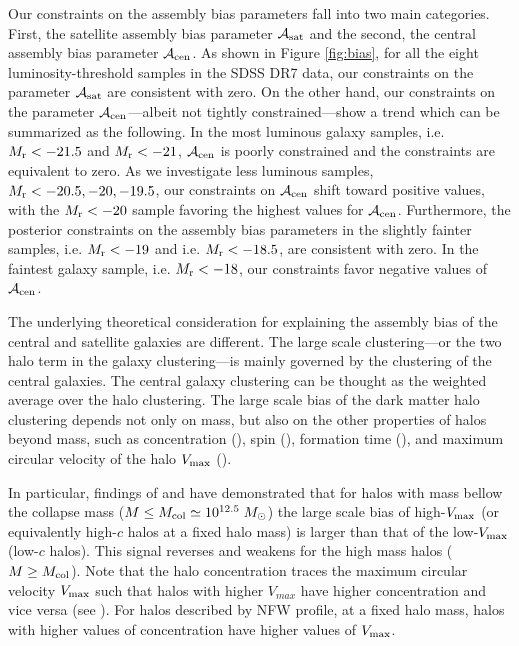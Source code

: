 \documentclass[12pt, preprint]{aastex}
\newcommand{\acen}{\mathcal{A}_{\rm cen}}
\newcommand{\asat}{\mathcal{A}_{\rm sat}}
\begin{document}
Our constraints on the assembly bias parameters fall into two main categories. First, the satellite 
assembly bias parameter $\asat$ and the second, the central assembly bias parameter $\acen$. As shown in Figure \ref{fig:bias}, for all the eight luminosity-threshold samples in the SDSS DR7 data, our constraints on the parameter $\asat$ are 
consistent with zero. On the other hand, our constraints on the parameter $\acen$---albeit not tightly constrained---show a trend which can be summarized as the following. In the most luminous galaxy samples, i.e. $M_{\rm r} < -21.5$ and $M_{\rm r} < -21$, $\acen$ is poorly constrained and the constraints are equivalent to zero. As we investigate less luminous samples, $M_{\rm r} < -20.5 , -20, -19.5$, our constraints on $\acen$ shift toward positive values, with the $M_{\rm r}<-20$ sample favoring the highest values for $\acen$. Furthermore, the posterior constraints on the assembly bias parameters in the slightly fainter samples, i.e. $M_{\rm r} < -19$ and i.e. $M_{\rm r} < -18.5$, are consistent with zero. In the faintest galaxy sample, i.e. $M_{\rm r} < -18$, our constraints favor negative values of $\acen$.

The underlying theoretical consideration for explaining the assembly bias of the central 
and satellite galaxies are different. The large scale clustering---or the two halo term in the galaxy clustering---is mainly governed by the clustering of the central galaxies. The central galaxy clustering can be thought as the weighted average over the halo clustering. The large scale bias of the dark matter halo clustering depends not only on mass, but also on the other properties of halos beyond mass, such as concentration (\citealt{weschler2006,gao2007,miyatake2016}), spin (\citealt{gao2007}), formation time (\citealt{gao2007, li2008}), and maximum circular velocity of the halo $V_{\rm max}$ (\citealt{sunayama2016}).

In particular, findings of \citet{weschler2006} and \citet{sunayama2016}
have demonstrated that for halos with mass bellow the collapse mass ($M \leq M_{\rm col} \simeq 10^{12.5}\; M_{\odot} $) the large scale bias of high-$V_{\rm max}$ (or equivalently high-$c$ halos at a fixed halo mass) is larger than that of the low-$V_{\rm max}$ (low-$c$ halos). This signal reverses and weakens for the high mass halos ($M \geq M_{\rm col}$). Note that the halo concentration traces the maximum circular velocity $V_{\rm max}$ such that halos with higher $V_{max}$ have higher concentration and vice versa (see \citealt{prada2012}). For halos described by NFW profile, at a fixed halo mass, halos with higher values of concentration have higher values of $V_{\rm max}$.
\end{document}
